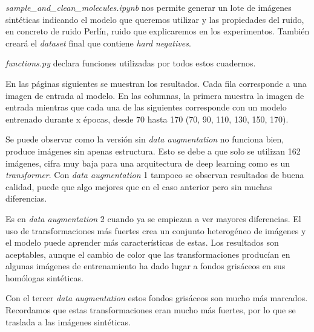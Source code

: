 \noindent \textit{sample\_and\_clean\_molecules.ipynb} nos permite generar un lote de imágenes sintéticas indicando el modelo que queremos utilizar y las propiedades del ruido, en concreto de ruido Perlín, ruido que explicaremos en los experimentos. También creará el \textit{dataset} final que contiene \textit{hard negatives}.

\noindent \textit{functions.py} declara funciones utilizadas por todos estos cuadernos.

\newpage
En las páginas siguientes se muestran los resultados. Cada fila corresponde a una imagen de entrada al modelo. En las columnas, la primera muestra la imagen de entrada mientras que cada una de las siguientes corresponde con un modelo entrenado durante x épocas, desde 70 hasta 170 (70, 90, 110, 130, 150, 170).

Se puede observar como la versión sin \textit{data augmentation} no funciona bien, produce imágenes sin apenas estructura. Esto se debe a que solo se utilizan 162 imágenes, cifra muy baja para una arquitectura de deep learning como es un \textit{transformer}. Con \textit{data augmentation} 1 tampoco se observan resultados de buena calidad, puede que algo mejores que en el caso anterior pero sin muchas diferencias.

Es en \textit{data augmentation} 2 cuando ya se empiezan a ver mayores diferencias. El uso de transformaciones más fuertes crea un conjunto heterogéneo de imágenes y el modelo puede aprender más características de estas. Los resultados son aceptables, aunque el cambio de color que las transformaciones producían en algunas imágenes de entrenamiento ha dado lugar a fondos grisáceos en sus homólogas sintéticas. 

Con el tercer \textit{data augmentation} estos fondos grisáceos son mucho más marcados. Recordamos que estas transformaciones eran mucho más fuertes, por lo que se traslada a las imágenes sintéticas.


